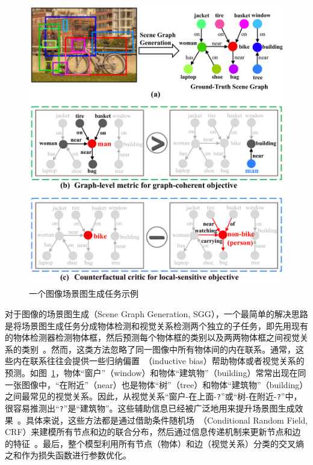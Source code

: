 \begin{figure}[htbp]
    \centering
    \includegraphics[width=0.8\linewidth]{chapter4/res/sgg.pdf}
    \caption{一个图像场景图生成任务示例}
    \label{ch4:fig:sgg}
\end{figure}


对于图像的场景图生成（Scene Graph Generation, SGG），一个最简单的解决思路是将场景图生成任务分成物体检测和视觉关系检测两个独立的子任务，即先用现有的物体检测器检测物体框，然后预测每个物体框的类别以及两两物体框之间视觉关系的类别~\cite{lu2016visual,zhang2017visual,yang2018shuffle}。然而，这类方法忽略了同一图像中所有物体间的内在联系。通常，这些内在联系往往会提供一些归纳偏置~\cite{divvala2009empirical}（inductive bias）帮助物体或者视觉关系的预测。如图~\ref{ch4:fig:sgg}，物体“窗户”（window）和物体“建筑物”（building）常常出现在同一张图像中，“在附近”（near）也是物体“树”（tree）和物体“建筑物”（building）之间最常见的视觉关系。因此，从视觉关系“窗户-在上面-\texttt{?}”或“树-在附近-\texttt{?}”中，很容易推测出“\texttt{?}”是“建筑物”。这些辅助信息已经被广泛地用来提升场景图生成效果~\cite{xu2017scene, dai2017detecting, li2017vip, li2017scene, li2018factorizable, yin2018zoom, jae2018tensorize, zellers2018neural, tang2019learning, gu2019scene, qi2019attentive, wang2019exploring, qian2019video}。具体来说，这些方法都是通过借助条件随机场~\cite{zheng2015conditional}（Conditional Random Field, CRF）来建模所有节点和边的联合分布，然后通过信息传递机制来更新节点和边的特征~\cite{krahenbuhl2011efficient}。最后，整个模型利用所有节点（物体）和边（视觉关系）分类的交叉熵之和作为损失函数进行参数优化。


